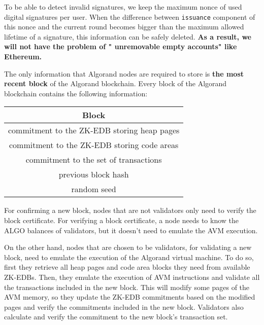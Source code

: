 \documentclass[11pt, A4]{report}
\begin{document}
    To be able to detect invalid signatures, we keep the maximum nonce of used digital signatures per user. When the
    difference between \texttt{issuance} component of this nonce and the current round becomes bigger than the
    maximum allowed lifetime of a signature, this information can be safely deleted. \textbf{As a result, we will not
    have the problem of " unremovable empty accounts" like Ethereum.}

    The only information that Algorand nodes are required to store is \textbf{the most recent block} of the Algorand
    blockchain. Every block of the Algorand blockchain contains the following information:

    \begin{center}
        \begin{tabular}{||c||}
            \hline
            Block \\ [0.5ex]
            \hline\hline
            commitment to the ZK-EDB storing heap pages \\ [0.7ex]
            commitment to the ZK-EDB storing code areas \\ [0.7ex]
            commitment to the set of transactions       \\ [0.7ex]
            previous block hash                         \\ [0.7ex]
            random seed                                 \\ [0.7ex]
            \hline
        \end{tabular}
    \end{center}

    For confirming a new block, nodes that are not validators only need to verify the block certificate. For
    verifying a block certificate, a node needs to know the ALGO balances of validators, but it doesn't need to
    emulate the AVM execution.

    On the other hand, nodes that are chosen to be validators, for validating a new block, need to emulate the
    execution of the Algorand virtual machine. To do so, first they retrieve all heap pages and code area blocks they
    need from available ZK-EDBs. Then, they emulate the execution of AVM instructions and validate all the
    transactions included in the new block. This will modify some pages of the AVM memory, so they update the ZK-EDB
    commitments based on the modified pages and verify the commitments included in the new block. Validators also
    calculate and verify the commitment to the new block's transaction set.
\end{document}
